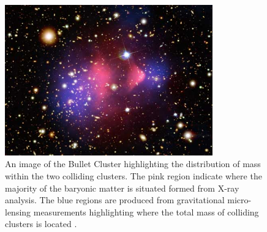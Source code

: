 \begin{figure}[ht!]
	\centering
	\includegraphics[width=0.8\textwidth]{figures/DMOverview/Bullet_cluster.jpg}
	\caption[An image of the Bullet Cluster highlighting the distribution of mass within the two colliding clusters.]{An image of the Bullet Cluster highlighting the distribution of mass within the two colliding clusters. The pink region indicate where the majority of the baryonic matter is situated formed from X-ray analysis. The blue regions are produced from gravitational micro-lensing measurements highlighting where the total mass of colliding clusters is located \cite{chandra}.}
	\label{fig:DMOverview/BulletComp}
\end{figure}

